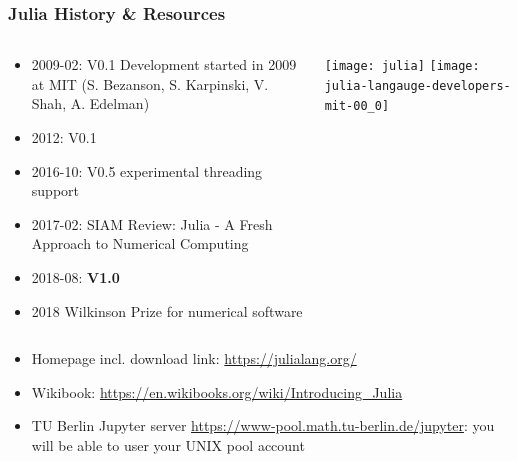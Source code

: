 \begin{frame}\frametitle{Julia History \& Resources}
  \begin{columns}
    \begin{column}{0.6\textwidth}
  \begin{itemize}
  \item 2009-02:  V0.1 Development started in 2009 at MIT (S. Bezanson, S. Karpinski, V. Shah, A. Edelman)
    
  \item    2012: V0.1
    
  \item 2016-10: V0.5 experimental threading support
  \item 2017-02: SIAM Review: Julia - A Fresh Approach to Numerical Computing
  \item 2018-08: \textbf{V1.0}
  \item 2018 Wilkinson Prize for numerical software
  \end{itemize}

    \end{column}
    \begin{column}{0.4\textwidth}
      \begin{center}
        \texttt{[image: julia]}
        \texttt{[image: julia-langauge-developers-mit-00\_0]}      
      \end{center}
    \end{column}
  \end{columns}

  \vfill
  \begin{itemize}
  \item Homepage incl. download link: \url{https://julialang.org/}
  \item Wikibook: \url{https://en.wikibooks.org/wiki/Introducing_Julia}
  \item TU Berlin Jupyter server \url{https://www-pool.math.tu-berlin.de/jupyter}: you will
    be able to user your UNIX pool account
  \end{itemize}


\end{frame}


